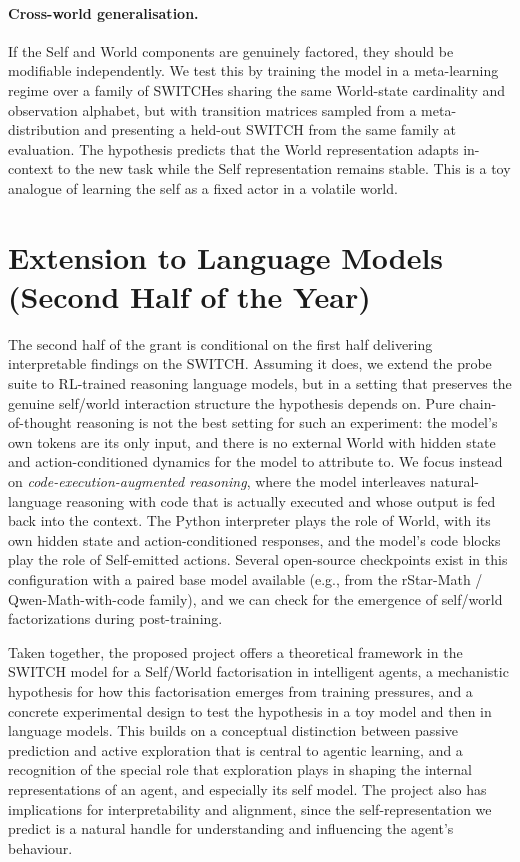 \documentclass[11pt]{article}
\begin{document}
\paragraph{Cross-world generalisation.} If the Self and World components are genuinely factored, they should be modifiable independently. We test this by training the model in a meta-learning regime over a family of SWITCHes sharing the same World-state cardinality and observation alphabet, but with transition matrices sampled from a meta-distribution and presenting a held-out SWITCH from the same family at evaluation. The hypothesis predicts that the World representation adapts in-context to the new task while the Self representation remains stable. This is a toy analogue of learning the self as a fixed actor in a volatile world.

\section*{Extension to Language Models (Second Half of the Year)}

The second half of the grant is conditional on the first half delivering interpretable findings on the SWITCH. Assuming it does, we extend the probe suite to RL-trained reasoning language models, but in a setting that preserves the genuine self/world interaction structure the hypothesis depends on. Pure chain-of-thought reasoning is not the best setting for such an experiment: the model's own tokens are its only input, and there is no external World with hidden state and action-conditioned dynamics for the model to attribute to. We focus instead on \emph{code-execution-augmented reasoning}, where the model interleaves natural-language reasoning with code that is actually executed and whose output is fed back into the context. The Python interpreter plays the role of World, with its own hidden state and action-conditioned responses, and the model's code blocks play the role of Self-emitted actions. Several open-source checkpoints exist in this configuration with a paired base model available (e.g., from the rStar-Math / Qwen-Math-with-code family), and we can check for the emergence of self/world factorizations during post-training.

Taken together, the proposed project offers a theoretical framework in the SWITCH model for a Self/World factorisation in intelligent agents, a mechanistic hypothesis for how this factorisation emerges from training pressures, and a concrete experimental design to test the hypothesis in a toy model and then in language models. This builds on a conceptual distinction between passive prediction and active exploration that is central to agentic learning, and a recognition of the special role that exploration plays in shaping the internal representations of an agent, and especially its self model. The project also has implications for interpretability and alignment, since the self-representation we predict is a natural handle for understanding and influencing the agent's behaviour.


\end{document}
